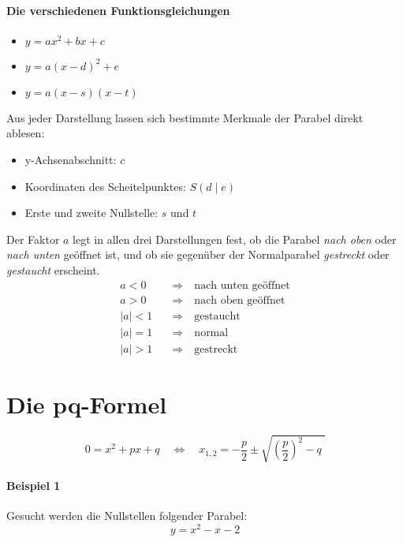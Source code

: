 \documentclass
[
  draft    = true,
  fontsize = 11pt,
  parskip  = half-,
  BCOR     = 0pt,
  DIV      = calc
]
{scrartcl}
\begin{document}
\paragraph{Die verschiedenen Funktionsgleichungen}
\begin{itemize}
  \item {}         $y=ax^{2}+bx+c$
  \item {}  $y=a(x-d)^{2}+e$
  \item {} $y=a(x-s)(x-t)$
\end{itemize}
Aus jeder Darstellung lassen sich bestimmte Merkmale
der Parabel direkt ablesen:
\begin{itemize}
  \item y-Achsenabschnitt: $c$
  \item Koordinaten des Scheitelpunktes: $S(d\mid e)$
  \item Erste und zweite Nullstelle: $s$ und $t$
\end{itemize}
Der Faktor $a$ legt in allen drei Darstellungen fest, ob die Parabel
\emph{nach oben} oder \emph{nach unten} geöffnet ist, und ob sie
gegenüber der Normalparabel \emph{gestreckt} oder \emph{gestaucht}
erscheint.
\begin{equation*}
  \begin{split}
    a<0&\quad\Rightarrow\quad\text{nach unten geöffnet} \\
    a>0&\quad\Rightarrow\quad\text{nach oben geöffnet}  \\
    |a|<1&\quad\Rightarrow\quad\text{gestaucht} \\
    |a|=1&\quad\Rightarrow\quad\text{normal}    \\
    |a|>1&\quad\Rightarrow\quad\text{gestreckt}
  \end{split}
\end{equation*}

\section*{Die pq-Formel}
\begin{equation*}
  0=x^{2}+px+q
  \quad\Leftrightarrow\quad
  x_{1,2}=-\frac{p}{2}\pm\sqrt{\left(\frac{p}{2}\right)^{2}-q\;}
\end{equation*}

\paragraph{Beispiel 1}
Gesucht werden die Nullstellen folgender Parabel:
\begin{equation*}
  y=x^{2}-x-2
\end{equation*}
\end{document}
